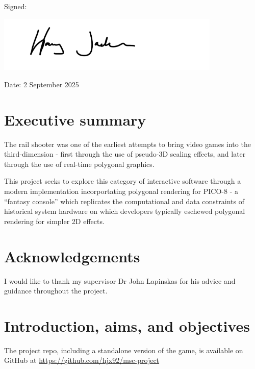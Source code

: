 \documentclass[11pt]{article}
\begin{document}
\vspace{0.5cm}

Signed:

\includegraphics[width=0.8\textwidth]{signature}

Date: 2 September 2025

\newpage

\section*{Executive summary}

\vspace{0.5cm}

The rail shooter was one of the earliest attempts to bring video
games into the third-dimension - first through the use of pseudo-3D
scaling effects, and later through the use of real-time polygonal graphics.

This project seeks to explore this category of interactive software through a
modern implementation incorportating polygonal rendering for PICO-8 - a
``fantasy console'' which replicates the computational and data constraints of
historical system hardware on which developers typically eschewed polygonal
rendering for simpler 2D effects.

\vspace{1.5cm}

\section*{Acknowledgements}

\vspace{0.5cm}

I would like to thank my supervisor Dr John Lapinskas for his advice and guidance
throughout the project.

\newpage

\tableofcontents

\newpage

\section{Introduction, aims, and objectives}

The project repo, including a standalone version of the game, is available on GitHub at 
\url{https://github.com/hjx92/msc-project}
\end{document}
